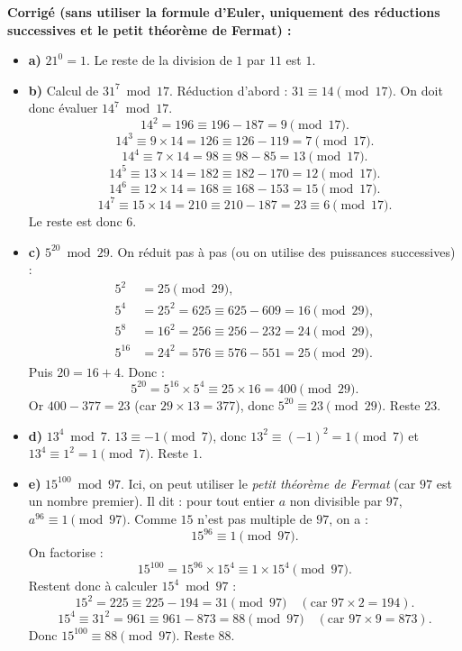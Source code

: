 \documentclass[a4paper,12pt]{article}
\begin{document}
    \begin{solutionbox}
    \textbf{Corrigé (sans utiliser la formule d’Euler, uniquement des réductions successives et le petit théorème de Fermat) :}
    
    \begin{itemize}
      \item \textbf{a)} $21^0 = 1$.  
      Le reste de la division de $1$ par $11$ est $1$.
    
      \item \textbf{b)} Calcul de $31^7 \bmod 17$.  
      Réduction d’abord : $31 \equiv 14 \pmod{17}$.  
      On doit donc évaluer $14^7 \bmod 17$.  
      $$14^2 = 196 \equiv 196 - 187 = 9 \pmod{17}.$$  
      $$14^3 \equiv 9 \times 14 = 126 \equiv 126 - 119 = 7 \pmod{17}.$$  
      $$14^4 \equiv 7 \times 14 = 98 \equiv 98 - 85 = 13 \pmod{17}.$$  
      $$14^5 \equiv 13 \times 14 = 182 \equiv 182 - 170 = 12 \pmod{17}.$$  
      $$14^6 \equiv 12 \times 14 = 168 \equiv 168 - 153 = 15 \pmod{17}.$$  
      $$14^7 \equiv 15 \times 14 = 210 \equiv 210 - 187 = 23 \equiv 6 \pmod{17}.$$  
      Le reste est donc $6$.
    
      \item \textbf{c)} $5^{20} \bmod 29$.  
      On réduit pas à pas (ou on utilise des puissances successives) :  
      \begin{align*}
        5^2 &= 25 \pmod{29},\\
        5^4 &= 25^2 = 625 \equiv 625 - 609 = 16 \pmod{29},\\
        5^8 &= 16^2 = 256 \equiv 256 - 232 = 24 \pmod{29},\\
        5^{16} &= 24^2 = 576 \equiv 576 - 551 = 25 \pmod{29}.
      \end{align*}
      Puis $20 = 16 + 4$. Donc :
      $$5^{20} = 5^{16} \times 5^4 \equiv 25 \times 16 = 400 \pmod{29}.$$  
      Or $400 - 377 = 23$ (car $29 \times 13 = 377$), donc $5^{20} \equiv 23 \pmod{29}$.  
      Reste $23$.
    
      \item \textbf{d)} $13^4 \bmod 7$.  
      $13 \equiv -1 \pmod{7}$, donc $13^2 \equiv (-1)^2 = 1 \pmod{7}$ et $13^4 \equiv 1^2 = 1 \pmod{7}$.  
      Reste $1$.
    
      \item \textbf{e)} $15^{100} \bmod 97$.  
      Ici, on peut utiliser le \emph{petit théorème de Fermat} (car $97$ est un nombre premier). Il dit : pour tout entier $a$ non divisible par $97$, $a^{96} \equiv 1 \pmod{97}$.  
      Comme $15$ n’est pas multiple de $97$, on a :  
      $$15^{96} \equiv 1 \pmod{97}.$$  
      On factorise :  
      $$15^{100} = 15^{96} \times 15^4 \equiv 1 \times 15^4 \pmod{97}.$$  
      Restent donc à calculer $15^4 \bmod 97$ :  
      $$15^2 = 225 \equiv 225 - 194 = 31 \pmod{97} \quad (\text{car } 97 \times 2 = 194).$$  
      $$15^4 \equiv 31^2 = 961 \equiv 961 - 873 = 88 \pmod{97} \quad (\text{car } 97 \times 9 = 873).$$  
      Donc $15^{100} \equiv 88 \pmod{97}$.  
      Reste $88$.
    \end{itemize}
    \end{solutionbox}
    
\end{document}

